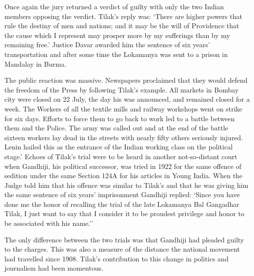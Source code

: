 Once again the jury returned a verdict of guilty with only the two Indian members opposing the verdict. Tilak's reply was: `There are higher powers that rule the destiny of men and nations; and it may be the will of Providence that the cause which I represent may prosper more by my sufferings than by my remaining free.' Justice Davar awarded him the sentence of six years' transportation and after some time the Lokamanya was sent to a prison in Mandalay in Burma.

The public reaction was massive. Newspapers proclaimed that they would defend the freedom of the Press by following Tilak's example. All markets in Bombay city were closed on 22 July, the day his was announced, and remained closed for a week. The Workers of all the textile mills and railway workshops went on strike for six days. Efforts to force them to go back to work led to a battle between them and the Police. The army was called out and at the end of the battle sixteen workers lay dead in the streets with nearly fifty others seriously injured. Lenin hailed this as the entrance of the Indian working class on the political stage.' Echoes of Tilak's trial were to be heard in another not-so-distant court when Gandhiji, his political successor, was tried in 1922 for the same offence of sedition under the same Section 124A for his articles in Young India. When the Judge told him that his offence was similar to Tilak's and that he was giving him the same sentence of six years' imprisonment Gandhiji replied: `Since you have done me the honor of recalling the trial of the late Lokamanya Bal Gangadhar Tilak, I just want to say that I consider it to be proudest privilege and honor to be associated with his name.''

The only difference between the two trials was that Gandhiji had pleaded guilty to the charges. This was also a measure of the distance the national movement had travelled since 1908. Tilak's contribution to this change in politics and journalism had been momentous.
